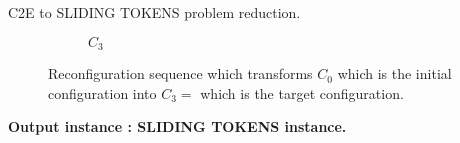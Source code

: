 \begin{example}{C2E to SLIDING TOKENS problem reduction. \\}
\begin{figure}[H]
\begin{subfigure}[b]{0.4\textwidth}
\begin{scaletikzpicturetowidth}{\textwidth}
    \end{scaletikzpicturetowidth}
    \caption{$C_3$}
    \label{fig:input_instance_3}
  \end{subfigure}
  \caption{Reconfiguration sequence which transforms $C_0$ which is the initial configuration into $C_3 = $ which is the target configuration.}
  \label{fig:input_instance_config_to_config}
\end{figure}

\textbf{Output instance : SLIDING TOKENS instance.} \hfill


\end{example}
